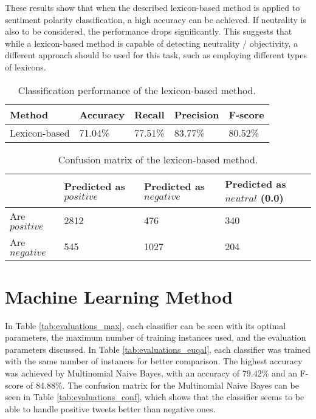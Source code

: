 These results show that when the described lexicon-based method is applied to sentiment polarity classification, a high accuracy can be achieved. If neutrality is also to be considered, the performance drops significantly. This suggests that while a lexicon-based method is capable of detecting neutrality / objectivity, a different approach should be used for this task, such as employing different types of lexicons.

\begin{table}
\caption{Classification performance of the lexicon-based method.}
\label{tab:eval_lex}
\centering
\begin{tabular}{ |p{3cm}||p{2cm}|p{2cm}|p{2cm}|p{2cm}|}
 \hline
 Method &          Accuracy &      Recall &     Precision& F-score \\
  \hline
 Lexicon-based & 71.04\% & 77.51\% & 83.77\% & 80.52\% \\
 \hline
 \end{tabular}
 
\end{table}
\begin{table}
\centering
\caption{Confusion matrix of the lexicon-based method.}
\begin{tabular}{ |p{3cm}||p{3cm}|p{3cm}|p{3cm}| }
 \hline
  &          Predicted as $positive$ &Predicted as $negative$  & Predicted as $neutral$ (0.0)\\
 \hline
 Are $positive$        & 2812&            476 & 340\\
  \hline
 Are $negative$  &545&                     1027 & 204\\
 \hline

\end{tabular}
\label{tab:evaluations_conf_lex}
\end{table}


\section{Machine Learning Method}

In Table \ref{tab:evaluations_max}, each classifier can be seen with its optimal parameters, the maximum number of training instances used, and the evaluation parameters discussed. In Table \ref{tab:evaluations_euqal}, each classifier was trained with the same number of instances for better comparison. The highest accuracy was achieved by Multinomial Naive Bayes, with an accuracy of 79.42\% and an F-score of 84.88\%. The confusion matrix for the Multinomial Naive Bayes can be seen in Table \ref{tab:evaluations_conf}, which shows that the classifier seems to be able to handle positive tweets better than negative ones.


